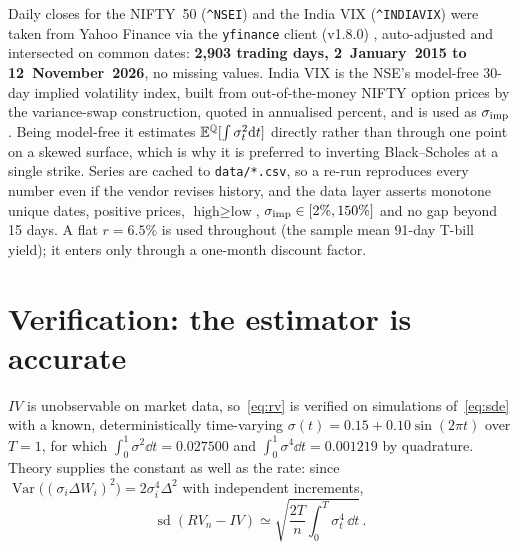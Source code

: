 \documentclass[10pt,a4paper]{article}
\begin{document}
Daily closes for the NIFTY~50 (\texttt{\^{}NSEI}) and the India VIX (\texttt{\^{}INDIAVIX})
were taken from Yahoo Finance via the \texttt{yfinance} client (v1.8.0) \cite{nsedata}, auto-adjusted and
intersected on common dates: \textbf{2,903 trading days, 2~January~2015 to 12~November~2026},
no missing values. India VIX is the NSE's model-free 30-day implied volatility index, built
from out-of-the-money NIFTY option prices by the variance-swap construction, quoted in
annualised percent, and is used as $\sigma_{\mathrm{imp}}$. Being model-free it estimates
$\mathbb{E}^{\mathbb{Q}}[\int\sigma_t^2\mathrm{d} t]$ directly rather than through one point on a skewed surface,
which is why it is preferred to inverting Black--Scholes at a single strike. Series are cached
to \texttt{data/*.csv}, so a re-run reproduces every number even if the vendor revises history,
and the data layer asserts monotone unique dates, positive prices, $\text{high}\ge\text{low}$,
$\sigma_{\mathrm{imp}}\in[2\%,150\%]$ and no gap beyond 15 days. A flat $r=6.5\%$ is used throughout (the sample
mean 91-day T-bill yield); it enters only through a one-month discount factor.

\section{Verification: the estimator is accurate}
\label{sec:verify}

$IV$ is unobservable on market data, so~\eqref{eq:rv} is verified on simulations
of~\eqref{eq:sde} with a known, deterministically time-varying $\sigma(t)=0.15+0.10\sin(2\pi t)$
over $T=1$, for which $\int_0^1\sigma^2\dd t=0.027500$ and $\int_0^1\sigma^4\dd t=0.001219$ by
quadrature. Theory supplies the constant as well as the rate: since
$\operatorname{Var}\big((\sigma_i\Delta W_i)^2\big)=2\sigma_i^4\Delta^2$ with independent
increments,
\begin{equation}
  \operatorname{sd}(RV_n-IV)\simeq\sqrt{\frac{2T}{n}\int_0^T\sigma_t^4\,\dd t}\,.
  \label{eq:rvse}
\end{equation}
\end{document}
